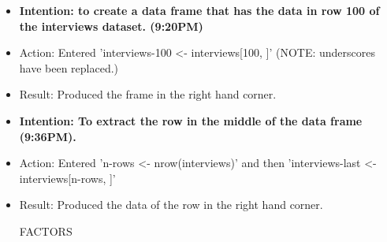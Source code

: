 \documentclass[a4paper,12pt]{article}
\begin{document}
\begin{itemize}
\item \textbf{Intention: to create a data frame that has the data in row 100 of the interviews dataset. (9:20PM)}


\item Action: Entered 'interviews-100 <- interviews[100, ]' (NOTE: underscores have been replaced.)


\item Result: Produced the frame in the right hand corner. 


\item \textbf{Intention: To extract the row in the middle of the data frame (9:36PM).}


\item Action: Entered 'n-rows <- nrow(interviews)' and then 'interviews-last <- interviews[n-rows, ]'


\item Result: Produced the data of the row in the right hand corner.

FACTORS





\end{itemize}
\end{document}
